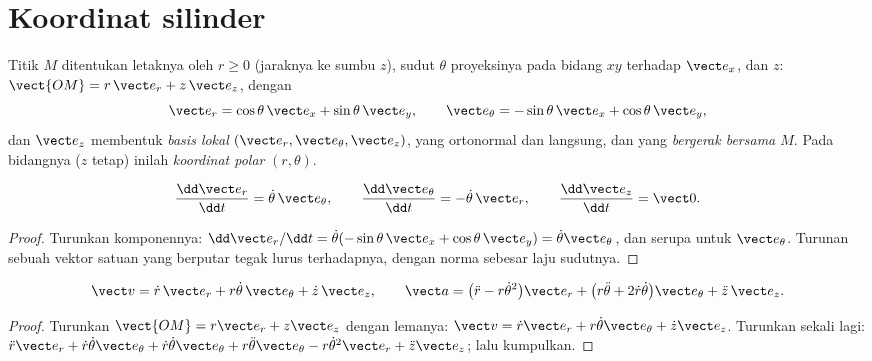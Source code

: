 \section{Koordinat silinder}

\begin{definition}\label{def:b1:point-kinematics:cylindrical}
Titik $M$ ditentukan letaknya oleh $r \geq 0$ (jaraknya ke sumbu $z$),
sudut $\theta$ proyeksinya pada bidang $xy$ terhadap $\vect e_x$,
dan $z$: $\vect{OM} = r\,\vect e_r + z\,\vect e_z$, dengan
\[
\vect e_r = \cos\theta\,\vect e_x + \sin\theta\,\vect e_y, \qquad
\vect e_\theta = -\sin\theta\,\vect e_x + \cos\theta\,\vect e_y,
\]
dan $\vect e_z$ membentuk \emph{basis lokal} $(\vect e_r, \vect e_\theta,
\vect e_z)$, yang ortonormal dan langsung, dan yang \emph{bergerak
bersama $M$}. Pada bidangnya ($z$ tetap) inilah \emph{koordinat polar}
$(r, \theta)$.
\end{definition}

\begin{lemma}\label{lem:b1:point-kinematics:basisderiv}
\[
\frac{\dd\vect e_r}{\dd t} = \dot\theta\,\vect e_\theta, \qquad
\frac{\dd\vect e_\theta}{\dd t} = -\dot\theta\,\vect e_r, \qquad
\frac{\dd\vect e_z}{\dd t} = \vect 0 .
\]
\end{lemma}

\begin{proof}
Turunkan komponennya: $\dd\vect e_r/\dd t = \dot\theta(-\sin\theta\,
\vect e_x + \cos\theta\,\vect e_y) = \dot\theta\vect e_\theta$, dan
serupa untuk $\vect e_\theta$. Turunan sebuah vektor satuan yang
berputar tegak lurus terhadapnya, dengan norma sebesar laju sudutnya.
\end{proof}

\begin{theorem}\label{thm:b1:point-kinematics:cylindrical}
\[
\vect v = \dot r\,\vect e_r + r\dot\theta\,\vect e_\theta + \dot z\,\vect e_z,
\qquad
\vect a = \big(\ddot r - r\dot\theta^2\big)\vect e_r
+ \big(r\ddot\theta + 2\dot r\dot\theta\big)\vect e_\theta + \ddot z\,\vect e_z .
\]
\end{theorem}

\begin{proof}
Turunkan $\vect{OM} = r\vect e_r + z\vect e_z$ dengan lemanya:
$\vect v = \dot r\vect e_r + r\dot\theta\vect e_\theta + \dot z\vect e_z$.
Turunkan sekali lagi: $\ddot r\vect e_r + \dot r\dot\theta\vect e_\theta +
\dot r\dot\theta\vect e_\theta + r\ddot\theta\vect e_\theta - r\dot\theta^2
\vect e_r + \ddot z\vect e_z$; lalu kumpulkan.
\end{proof}

